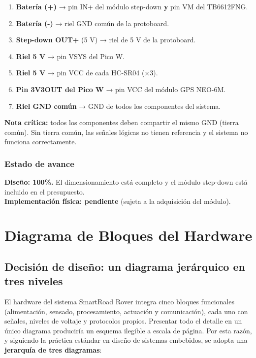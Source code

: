 \documentclass[12pt]{report}
\begin{document}
\begin{enumerate}
    \item \textbf{Batería (+)} → pin IN+ del módulo step-down \textbf{y} pin VM del TB6612FNG.
    \item \textbf{Batería (-)} → riel GND común de la protoboard.
    \item \textbf{Step-down OUT+} (5 V) → riel de 5 V de la protoboard.
    \item \textbf{Riel 5 V} → pin VSYS del Pico W.
    \item \textbf{Riel 5 V} → pin VCC de cada HC-SR04 (×3).
    \item \textbf{Pin 3V3OUT del Pico W} → pin VCC del módulo GPS NEO-6M.
    \item \textbf{Riel GND común} → GND de todos los componentes del sistema.
\end{enumerate}

\textbf{Nota crítica:} todos los componentes deben compartir el mismo GND (tierra común). Sin tierra común, las señales lógicas no tienen referencia y el sistema no funciona correctamente.

\subsection{Estado de avance}

\textbf{Diseño: 100\%.} El dimensionamiento está completo y el módulo step-down está incluido en el presupuesto.\\
\textbf{Implementación física: pendiente} (sujeta a la adquisición del módulo).

\chapter{Diagrama de Bloques del Hardware}

\section{Decisión de diseño: un diagrama jerárquico en tres niveles}

El hardware del sistema SmartRoad Rover integra cinco bloques funcionales (alimentación, sensado, procesamiento, actuación y comunicación), cada uno con señales, niveles de voltaje y protocolos propios. Presentar todo el detalle en un único diagrama produciría un esquema ilegible a escala de página. Por esta razón, y siguiendo la práctica estándar en diseño de sistemas embebidos, se adopta una \textbf{jerarquía de tres diagramas}:
\end{document}

